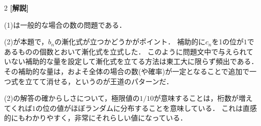 \documentclass[../../main.tex]{subfiles}
\begin{document}
\begin{multicols}{2}
  {\bf [解説]}

  (1)は一般的な場合の数の問題である．

  (2)が本題で，$b_n$の漸化式が立つかどうかがポイント．
  補助的に$c_n$を1の位が$1$であるものの個数とおいて漸化式を立式した．
  このように問題文中で与えられていない補助的な量を設定して漸化式を立てる方法は東工大に限らず頻出である．
  その補助的な量は，およそ全体の場合の数(や確率)が一定となることで追加で一つ式を立てて消せる，というのが王道のパターンだ．

  (2)の解答の確からしさについて，極限値の$1/10$が意味することは，桁数が増えてくれば$1$の位の値がほぼランダムに分布することを意味している．
  これは直感的にもわかりやすく，非常にそれらしい値になっている．

  \newpage
\end{multicols}
\end{document}
